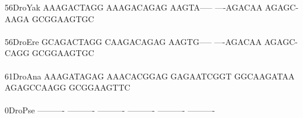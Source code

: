 \documentclass[11pt,twoside,reqno,a4paper]{article}
\begin{document}
{56\hspace*{3\charwidth}DroYak	AAAGACTAGG	AAAGACAGAG	AAGTA-----	----AGACAA	AGAGC-AAGA	GCGGAAGTGC	\\
\hspace*{5\charwidth}\hspace*{7\charwidth}\hspace*{1\charwidth}\hspace*{1\charwidth}\hspace*{1\charwidth}\hspace*{1\charwidth}\hspace*{1\charwidth}\hspace*{1\charwidth}\\
56\hspace*{3\charwidth}DroEre	GCAGACTAGG	CAAGACAGAG	AAGTG-----	----AGACAA	AGAGC-CAGG	GCGGAAGTGC	\\
\hspace*{5\charwidth}\hspace*{7\charwidth}\hspace*{1\charwidth}\hspace*{1\charwidth}\hspace*{1\charwidth}\hspace*{1\charwidth}\hspace*{1\charwidth}\hspace*{1\charwidth}\\
61\hspace*{3\charwidth}DroAna	AAAGATAGAG	AAACACGGAG	GAGAATCGGT	GGCAAGATAA	AGAGCCAAGG	GCGGAAGTTC	\\
\hspace*{5\charwidth}\hspace*{7\charwidth}\hspace*{1\charwidth}\hspace*{1\charwidth}\hspace*{1\charwidth}\hspace*{1\charwidth}\hspace*{1\charwidth}\hspace*{1\charwidth}\\
0\hspace*{4\charwidth}DroPse	----------	----------	----------	----------	----------	----------	\\
\hspace*{5\charwidth}\hspace*{7\charwidth}\hspace*{1\charwidth}\hspace*{1\charwidth}\hspace*{1\charwidth}\hspace*{1\charwidth}\hspace*{1\charwidth}\hspace*{1\charwidth}\\
}
\end{document}
